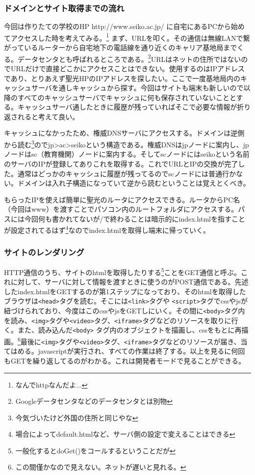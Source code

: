 \documentclass[dvipdfmx,jb5]{jarticle}
\begin{document}
\subsubsection{ドメインとサイト取得までの流れ}
今回は作りたての学校のHP http://www.seiko.ac.jp/ に自宅にあるPCから始めてアクセスした時を考えてみる。\footnote{なんでhttpなんだよ...} まず、URLを叩く。その通信は無線LANで繋がっているルーターから自宅地下の電話線を通り近くのキャリア基地局までくる。データセンタとも呼ばれるところである。\footnote{Googleデータセンタなどのデータセンタとは別物}URLはネットの住所ではないのでURLだけで直接どこかにアクセスことはできない。使用するのはIPアドレスであり、とりあえず聖光HPのIPアドレスを探したい。ここで一度基地局内のキャッシュサーバを通しキャッシュから探す。今回はサイトも端末も新しいので以降のすべてのキャッシュサーバでキャッシュに何も保存されていないこととする。キャッシュサーバ通したときに履歴が残っていればそこで必要な情報が折り返されると考えて良い。

キャッシュになかったため、権威DNSサーバにアクセスする。ドメインは逆側から読む\footnote{今気づいたけど外国の住所と同じやな}のでjp\textgreater\textbar ac\textgreater\textbar seikoという構造である。権威DNSはjpノードに案内し、jpノードはsc（教育機関）ノードに案内する。そしてscノードにはseikoという名前のサーバのIPが登録してありこれを取得する。これでURLとIPの交換が完了した。通常はどっかのキャッシュに履歴が残ってるのでscノードには普通行かない。ドメインは入れ子構造になっていて逆から読むということは覚えとくべき。

もらったIPを使えば簡単に聖光のルータにアクセスできる。ルータからPC名（今回はwww）を渡すことでパソコン内のルートフォルダにアクセスする。パスには今回何も書かれてないが/で終わることは暗示的にindex.htmlを指すことが設定されてるはず\footnote{場合によってdefault.htmlなど、サーバ側の設定で変えることはできる}なのでindex.htmlを取得し端末に帰っていく。
\subsubsection{サイトのレンダリング}
HTTP通信のうち、サイトのhtmlを取得したりする\footnote{一般化するとdoGet()をコールするということだが}ことをGET通信と呼ぶ。これに対して、サーバに対して情報を渡すときに使うのがPOST通信である。先述したindex.htmlをGETするのが第1ステップになっており、そのhtmlを取得したブラウザは\verb|<head>|タグを読む。そこには\verb|<link>|タグや \verb|<script>|タグでcssやjsが紐づけられており、今度はこのcssやjsをGETしにいく。その間に\verb|<body>|タグ内を読み、\verb|<img>|タグや\verb|<video>|タグ、\verb|<iframe>|タグなどのリソースを取りに行く。また、読み込んだ\verb|<body>| タグ内のオブジェクトを描画し、cssをもとに再描画。\footnote{この間僅かなので見えない。ネットが遅いと見れる。}最後に\verb|<img>|タグや\verb|<video>|タグ、\verb|<iframe>|タグなどのリソースが届き、当てはめる。javascriptが実行され、すべての作業は終了する。以上を見るに何回もGETを繰り返してるのがわかる。これは開発者モードで見ることができる。
\end{document}

